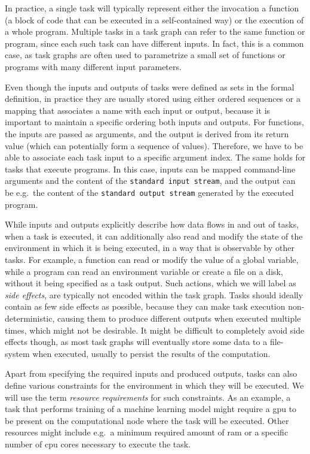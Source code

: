 In practice, a single task will typically represent either the invocation a function (a block of
code that can be executed in a self-contained way) or the execution of a whole program. Multiple
tasks in a task graph can refer to the same function or program, since each such task can have
different inputs. In fact, this is a common case, as task graphs are often used to parametrize a
small set of functions or programs with many different input parameters.

Even though the inputs and outputs of tasks were defined as sets in the formal definition, in
practice they are usually stored using either ordered sequences or a mapping that associates a name
with each input or output, because it is important to maintain a specific ordering both inputs and
outputs. For functions, the inputs are passed as arguments, and the output is derived from its
return value (which can potentially form a sequence of values). Therefore, we have to be able to
associate each task input to a specific argument index. The same holds for tasks that execute
programs. In this case, inputs can be mapped command-line arguments and the content of the
\texttt{standard input stream}, and the output can be e.g.\ the content of the \texttt{standard output stream}
generated by the executed program.

While inputs and outputs explicitly describe how data flows in and out of tasks, when a task is
executed, it can additionally also read and modify the state of the environment in which it is
being executed, in a way that is observable by other tasks. For example, a function can read or
modify the value of a global variable, while a program can read an environment variable or create a
file on a disk, without it being specified as a task output. Such actions, which we will label as
\emph{side effects}, are typically not encoded within the task graph. Tasks should ideally
contain as few side effects as possible, because they can make task execution non-deterministic,
causing them to produce different outputs when executed multiple times, which might not be
desirable. It might be difficult to completely avoid side effects though, as most task graphs will
eventually store some data to a file-system when executed, usually to persist the results of the
computation.

Apart from specifying the required inputs and produced outputs, tasks can also define various
constraints for the environment in which they will be executed. We will use the term
\emph{resource requirements} for such constraints. As an example, a task that performs training of a
machine learning model might require a \gls{gpu} to be present on the computational
node where the task will be executed. Other resources might include e.g.\ a minimum required amount
of \gls{ram} or a specific number of \gls{cpu} cores necessary to execute
the task.

